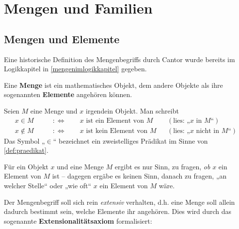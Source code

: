 


    
\chapter{Mengen und Familien}


\section{Mengen und Elemente}


Eine historische Definition des Mengenbegriffs durch Cantor wurde bereits im Logikkapitel in \cref{mengenimlogikkapitel} gegeben.


\begin{defin}[Menge] \label{def:menge} 
    Eine \textbf{Menge} ist ein mathematisches Objekt, dem andere Objekte als ihre sogenannten \textbf{Elemente} angehören können.%
\end{defin}


\begin{nota}[Elementzeichen]
    Seien $M$ eine Menge und $x$ irgendein Objekt. Man schreibt
    \begin{align*}
        x  \in M \qquad&:\Leftrightarrow\qquad \text{$x$ ist ein Element von $M$} && (\text{lies: „$x$ in $M$“})\\
        x\notin M \qquad &:\Leftrightarrow\qquad \text{$x$ ist kein Element von $M$} && (\text{lies: „$x$ nicht in $M$“})
    \end{align*}
    Das Symbol „$\in$“ bezeichnet ein zweistelliges Prädikat im Sinne von \cref{def:praedikat}.
\end{nota}


\noindent Für ein Objekt $x$ und eine Menge $M$ ergibt es nur Sinn, zu fragen, \emph{ob} $x$ ein Element von $M$ ist -- dagegen ergäbe es keinen Sinn, danach zu fragen, „an welcher Stelle“ oder „wie oft“ $x$ ein Element von $M$ wäre.

Der Mengenbegriff soll sich rein \emph{extensiv} verhalten, d.h. eine Menge soll allein dadurch bestimmt sein, welche Elemente ihr angehören. Dies wird durch das sogenannte \textbf{Extensionalitätsaxiom} formalisiert:


